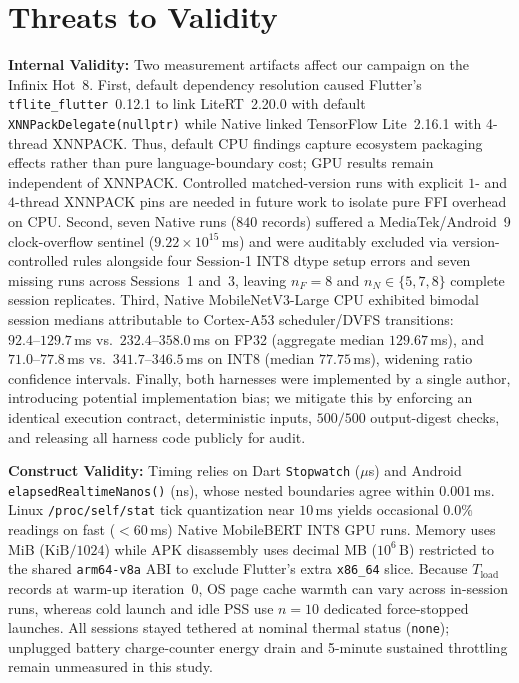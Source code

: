 \section{Threats to Validity}\label{sec:threats}

\textbf{Internal Validity:} Two measurement artifacts affect our campaign on the Infinix Hot~8. First, default dependency resolution caused Flutter's \texttt{tflite\_flutter}~0.12.1 to link LiteRT~2.20.0 with default \texttt{XNNPackDelegate(nullptr)} while Native linked TensorFlow Lite~2.16.1 with 4-thread XNNPACK. Thus, default CPU findings capture ecosystem packaging effects rather than pure language-boundary cost; GPU results remain independent of XNNPACK. Controlled matched-version runs with explicit $1$- and $4$-thread XNNPACK pins are needed in future work to isolate pure FFI overhead on CPU. Second, seven Native runs ($840$ records) suffered a MediaTek/Android~9 clock-overflow sentinel ($9.22 \times 10^{15}$\,ms) and were auditably excluded via version-controlled rules alongside four Session-1 INT8 dtype setup errors and seven missing runs across Sessions~1 and~3, leaving $n_F=8$ and $n_N \in \{5,7,8\}$ complete session replicates. Third, Native MobileNetV3-Large CPU exhibited bimodal session medians attributable to Cortex-A53 scheduler/DVFS transitions: $92.4\text{--}129.7$\,ms vs.\ $232.4\text{--}358.0$\,ms on FP32 (aggregate median $129.67$\,ms), and $71.0\text{--}77.8$\,ms vs.\ $341.7\text{--}346.5$\,ms on INT8 (median $77.75$\,ms), widening ratio confidence intervals. Finally, both harnesses were implemented by a single author, introducing potential implementation bias; we mitigate this by enforcing an identical execution contract, deterministic inputs, $500/500$ output-digest checks, and releasing all harness code publicly for audit.

\textbf{Construct Validity:} Timing relies on Dart \texttt{Stopwatch} ($\mu$s) and Android \texttt{elapsedRealtimeNanos()} (ns), whose nested boundaries agree within $0.001$\,ms. Linux \texttt{/proc/self/stat} tick quantization near $10$\,ms yields occasional $0.0\%$ readings on fast ($<60$\,ms) Native MobileBERT INT8 GPU runs. Memory uses MiB ($\text{KiB}/1024$) while APK disassembly uses decimal MB ($10^6$\,B) restricted to the shared \texttt{arm64-v8a} ABI to exclude Flutter's extra \texttt{x86\_64} slice. Because $T_{\mathrm{load}}$ records at warm-up iteration~0, OS page cache warmth can vary across in-session runs, whereas cold launch and idle PSS use $n=10$ dedicated force-stopped launches. All sessions stayed tethered at nominal thermal status (\texttt{none}); unplugged battery charge-counter energy drain and 5-minute sustained throttling remain unmeasured in this study.

